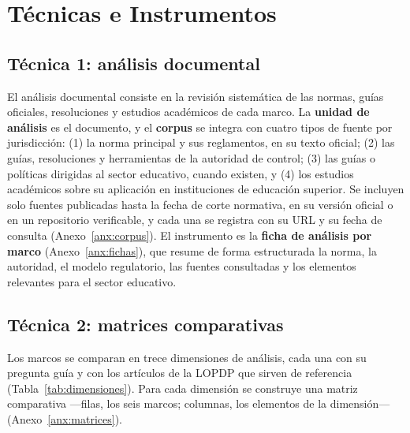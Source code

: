 \section{Técnicas e Instrumentos}
\label{sec:tecnicas}

\subsection{Técnica 1: análisis documental}

El análisis documental consiste en la revisión sistemática de las normas, guías oficiales, resoluciones y estudios académicos de cada marco. La \textbf{unidad de análisis} es el documento, y el \textbf{corpus} se integra con cuatro tipos de fuente por jurisdicción: (1) la norma principal y sus reglamentos, en su texto oficial; (2) las guías, resoluciones y herramientas de la autoridad de control; (3) las guías o políticas dirigidas al sector educativo, cuando existen, y (4) los estudios académicos sobre su aplicación en instituciones de educación superior. Se incluyen solo fuentes publicadas hasta la fecha de corte normativa, en su versión oficial o en un repositorio verificable, y cada una se registra con su URL y su fecha de consulta (Anexo~\ref{anx:corpus}). El instrumento es la \textbf{ficha de análisis por marco} (Anexo~\ref{anx:fichas}), que resume de forma estructurada la norma, la autoridad, el modelo regulatorio, las fuentes consultadas y los elementos relevantes para el sector educativo.

\subsection{Técnica 2: matrices comparativas}

Los marcos se comparan en trece dimensiones de análisis, cada una con su pregunta guía y con los artículos de la LOPDP que sirven de referencia (Tabla~\ref{tab:dimensiones}). Para cada dimensión se construye una matriz comparativa ---filas, los seis marcos; columnas, los elementos de la dimensión--- (Anexo~\ref{anx:matrices}).

